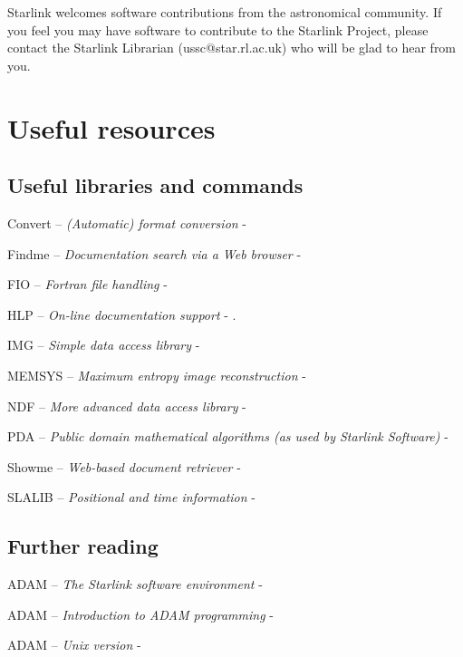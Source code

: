 Starlink welcomes software contributions from the astronomical community.
If you feel you may have software to contribute to the Starlink Project, 
please contact the Starlink Librarian ({\sf ussc@star.rl.ac.uk}) who 
will be glad to hear from you.

\newpage

\appendix

\section{Useful resources}

\subsection{Useful libraries and commands}

Convert -- {\em (Automatic) format conversion} - 

Findme -- {\em Documentation search via a Web browser} - 

FIO -- {\em Fortran file handling} - 

HLP -- {\em On-line documentation support} - .

IMG -- {\em Simple data access library} - 

MEMSYS -- {\em Maximum entropy image reconstruction} -

NDF -- {\em More advanced data access library} - 

PDA -- {\em Public domain mathematical algorithms (as used by Starlink 
Software)} - 

Showme -- {\em Web-based document retriever} -  

SLALIB -- {\em Positional and time information} - 

\subsection{Further reading}

ADAM -- {\em The Starlink software environment} - 

ADAM -- {\em Introduction to ADAM programming} - 

ADAM -- {\em Unix version} - 

